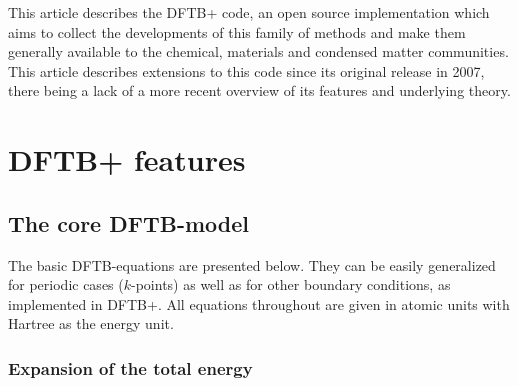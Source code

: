 \documentclass[reprint,onecolumn,superscriptaddress]{revtex4-1}
\newcommand{\dftbp}{DFTB+}
\begin{document}
This article describes the \dftbp{} code,\cite{dftbplus-repo} an
open source implementation which aims to collect the developments of this
family of methods and make them generally available to the chemical, materials
and condensed matter communities. This article describes extensions to this
code since its original release in 2007,\cite{aradi-jpca-2007} there being a
lack of a more recent overview of its features and underlying theory.

\section{\dftbp{} features}

\subsection{The core DFTB-model}

The basic DFTB-equations are presented below. They can be easily generalized for
periodic cases ($k$-points) as well as for other boundary conditions, as
implemented in \dftbp{}. All equations throughout are given in atomic units with
Hartree as the energy unit.

\subsubsection{Expansion of the total energy}
\end{document}
